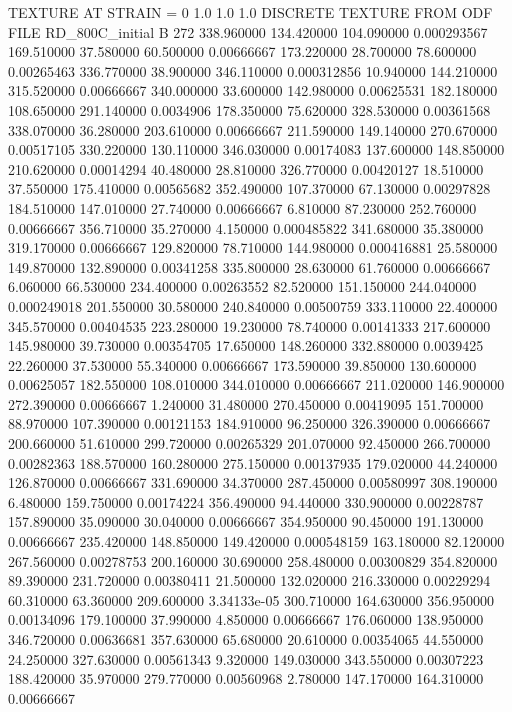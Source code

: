 TEXTURE AT STRAIN = 0
1.0   1.0   1.0
DISCRETE TEXTURE FROM ODF FILE RD_800C_initial
B 272
338.960000	134.420000	104.090000	0.000293567
169.510000	37.580000	60.500000	0.00666667
173.220000	28.700000	78.600000	0.00265463
336.770000	38.900000	346.110000	0.000312856
10.940000	144.210000	315.520000	0.00666667
340.000000	33.600000	142.980000	0.00625531
182.180000	108.650000	291.140000	0.0034906
178.350000	75.620000	328.530000	0.00361568
338.070000	36.280000	203.610000	0.00666667
211.590000	149.140000	270.670000	0.00517105
330.220000	130.110000	346.030000	0.00174083
137.600000	148.850000	210.620000	0.00014294
40.480000	28.810000	326.770000	0.00420127
18.510000	37.550000	175.410000	0.00565682
352.490000	107.370000	67.130000	0.00297828
184.510000	147.010000	27.740000	0.00666667
6.810000	87.230000	252.760000	0.00666667
356.710000	35.270000	4.150000	0.000485822
341.680000	35.380000	319.170000	0.00666667
129.820000	78.710000	144.980000	0.000416881
25.580000	149.870000	132.890000	0.00341258
335.800000	28.630000	61.760000	0.00666667
6.060000	66.530000	234.400000	0.00263552
82.520000	151.150000	244.040000	0.000249018
201.550000	30.580000	240.840000	0.00500759
333.110000	22.400000	345.570000	0.00404535
223.280000	19.230000	78.740000	0.00141333
217.600000	145.980000	39.730000	0.00354705
17.650000	148.260000	332.880000	0.0039425
22.260000	37.530000	55.340000	0.00666667
173.590000	39.850000	130.600000	0.00625057
182.550000	108.010000	344.010000	0.00666667
211.020000	146.900000	272.390000	0.00666667
1.240000	31.480000	270.450000	0.00419095
151.700000	88.970000	107.390000	0.00121153
184.910000	96.250000	326.390000	0.00666667
200.660000	51.610000	299.720000	0.00265329
201.070000	92.450000	266.700000	0.00282363
188.570000	160.280000	275.150000	0.00137935
179.020000	44.240000	126.870000	0.00666667
331.690000	34.370000	287.450000	0.00580997
308.190000	6.480000	159.750000	0.00174224
356.490000	94.440000	330.900000	0.00228787
157.890000	35.090000	30.040000	0.00666667
354.950000	90.450000	191.130000	0.00666667
235.420000	148.850000	149.420000	0.000548159
163.180000	82.120000	267.560000	0.00278753
200.160000	30.690000	258.480000	0.00300829
354.820000	89.390000	231.720000	0.00380411
21.500000	132.020000	216.330000	0.00229294
60.310000	63.360000	209.600000	3.34133e-05
300.710000	164.630000	356.950000	0.00134096
179.100000	37.990000	4.850000	0.00666667
176.060000	138.950000	346.720000	0.00636681
357.630000	65.680000	20.610000	0.00354065
44.550000	24.250000	327.630000	0.00561343
9.320000	149.030000	343.550000	0.00307223
188.420000	35.970000	279.770000	0.00560968
2.780000	147.170000	164.310000	0.00666667
